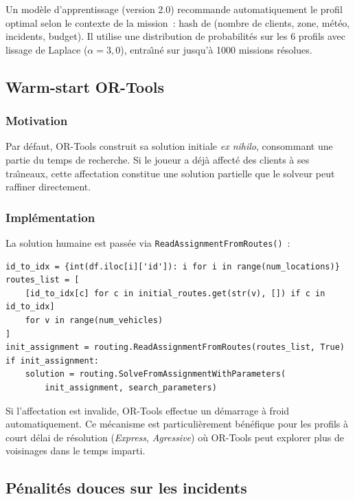 \documentclass[a4paper, 12pt, twoside]{article}
\begin{document}
Un mod\`{e}le d'apprentissage (version 2.0) recommande automatiquement le profil optimal selon le contexte de la mission~: hash de (nombre de clients, zone, m\'{e}t\'{e}o, incidents, budget). Il utilise une distribution de probabilit\'{e}s sur les 6 profils avec lissage de Laplace ($\alpha = 3{,}0$), entra\^{\i}n\'{e} sur jusqu'\`{a} 1000 missions r\'{e}solues.

\subsection{Warm-start OR-Tools}

\subsubsection{Motivation}

Par d\'{e}faut, OR-Tools construit sa solution initiale \textit{ex nihilo}, consommant une partie du temps de recherche. Si le joueur a d\'{e}j\`{a} affect\'{e} des clients \`{a} ses tra\^{\i}neaux, cette affectation constitue une solution partielle que le solveur peut raffiner directement.

\subsubsection{Impl\'{e}mentation}

La solution humaine est pass\'{e}e via \texttt{ReadAssignmentFromRoutes()}~:

\begin{lstlisting}[caption={Warm-start OR-Tools depuis la solution humaine}, label=lst:warmstart]
id_to_idx = {int(df.iloc[i]['id']): i for i in range(num_locations)}
routes_list = [
    [id_to_idx[c] for c in initial_routes.get(str(v), []) if c in id_to_idx]
    for v in range(num_vehicles)
]
init_assignment = routing.ReadAssignmentFromRoutes(routes_list, True)
if init_assignment:
    solution = routing.SolveFromAssignmentWithParameters(
        init_assignment, search_parameters)
\end{lstlisting}

Si l'affectation est invalide, OR-Tools effectue un d\'{e}marrage \`{a} froid automatiquement. Ce m\'{e}canisme est particuli\`{e}rement b\'{e}n\'{e}fique pour les profils \`{a} court d\'{e}lai de r\'{e}solution (\textit{Express}, \textit{Agressive}) o\`{u} OR-Tools peut explorer plus de voisinages dans le temps imparti.

\subsection{P\'{e}nalit\'{e}s douces sur les incidents}
\end{document}
